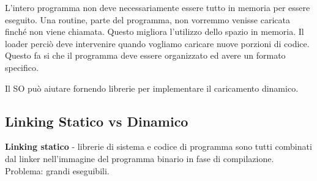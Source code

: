 



L'intero programma non deve necessariamente essere tutto in memoria per essere eseguito. Una routine, parte del programma, non vorremmo venisse caricata finché non viene chiamata.
Questo migliora l'utilizzo dello spazio in memoria. Il loader perciò deve intervenire quando vogliamo caricare nuove porzioni di codice.
Questo fa si che il programma deve essere organizzato ed avere un formato specifico.

Il SO può aiutare fornendo librerie per implementare il caricamento dinamico.







\subsection{Linking Statico vs Dinamico}
\textbf{Linking statico} - librerie di sistema e codice di programma sono tutti combinati dal linker nell'immagine del programma binario in fase di compilazione. Problema: grandi eseguibili.

